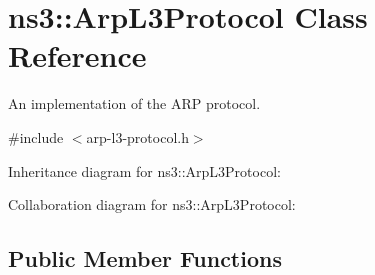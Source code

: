 \hypertarget{classns3_1_1ArpL3Protocol}{}\section{ns3\+:\+:Arp\+L3\+Protocol Class Reference}
\label{classns3_1_1ArpL3Protocol}


An implementation of the A\+RP protocol.  




{\ttfamily \#include $<$arp-\/l3-\/protocol.\+h$>$}



Inheritance diagram for ns3\+:\+:Arp\+L3\+Protocol\+:


Collaboration diagram for ns3\+:\+:Arp\+L3\+Protocol\+:
\subsection*{Public Member Functions}
